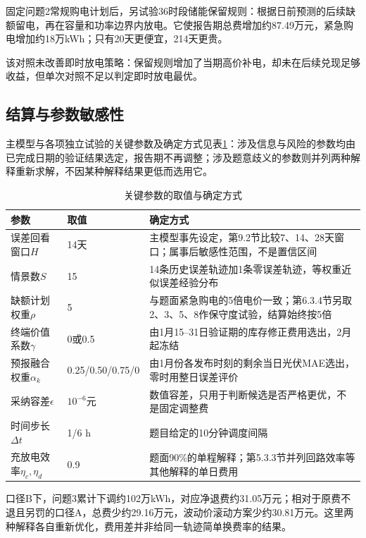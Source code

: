 \documentclass[UTF8,fontset=none,a4paper,zihao=-4]{ctexart}
\newcommand{\dd}{\Delta t}
\begin{document}
固定问题2常规购电计划后，另试验36时段储能保留规则：根据日前预测的后续缺额留电，再在容量和功率边界内放电。它使报告期总费增加约87.49万元，紧急购电增加约18万kWh；只有20天更便宜，214天更贵。

该对照未改善即时放电策略：保留规则增加了当期高价补电，却未在后续兑现足够收益，但单次对照不足以判定即时放电最优。

\subsection{结算与参数敏感性}
主模型与各项独立试验的关键参数及确定方式见表\ref{tab:key_params}：涉及信息与风险的参数均由已完成日期的验证结果选定，报告期不再调整；涉及题意歧义的参数则并列两种解释重新求解，不因某种解释结果更低而选用它。
\begin{table}[H]
\centering\small
\caption{关键参数的取值与确定方式}
\label{tab:key_params}
\begin{tabular}{>{\raggedright\arraybackslash}p{3.4cm}l>{\raggedright\arraybackslash}p{7.6cm}}\toprule
参数 & 取值 & 确定方式\\\midrule
误差回看窗口\(H\) & 14天 & 主模型事先设定，第9.2节比较7、14、28天窗口；属事后敏感性范围，不是置信区间\\
情景数\(S\) & 15 & 14条历史误差轨迹加1条零误差轨迹，等权重近似误差经验分布\\
缺额计划权重\(\rho\) & 5 & 与题面紧急购电的5倍电价一致；第6.3.4节另取2、3、5、8作保守度试验，结算始终按5倍\\
终端价值系数\(\gamma\) & 0或0.5 & 由1月15--31日验证期的库存修正费用选出，2月起冻结\\
预报融合权重\(\alpha_k\) & 0.25/0.50/0.75/0 & 由1月份各发布时刻的剩余当日光伏MAE选出，零时用整日误差评价\\
采纳容差\(\epsilon\) & \(10^{-6}\)元 & 数值容差，只用于判断候选是否严格更优，不是固定调整费\\
时间步长\(\dd\) & 1/6 h & 题目给定的10分钟调度间隔\\
充放电效率\(\eta_c,\eta_d\) & 0.9 & 题面90\%的单程解释；第5.3.3节并列回路效率等其他解释的单日费用\\
\bottomrule\end{tabular}
\end{table}


口径B下，问题3累计下调约102万kWh，对应净退费约31.05万元；相对于原费不退且另罚的口径A，总费少约29.16万元，波动价滚动方案少约30.81万元。这里两种解释各自重新优化，费用差并非给同一轨迹简单换费率的结果。
\end{document}
